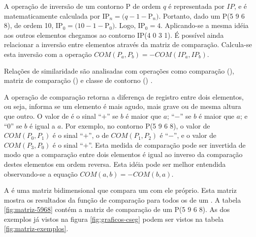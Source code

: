 A operação de inversão de um contorno P de ordem $q$ é representada
por $IP$, e é matematicamente calculada por
IP$_n=(q-1-$P$_n)$. Portanto, dado um  P(5 9 6 8), de ordem
10, IP$_0=(10-1-$P$_0)$. Logo, IP$_0=4$. Aplicando-se a mesma idéia
aos outros elementos chegamos ao contorno IP(4 0 3 1). É possível
ainda relacionar a inversão entre elementos através da matriz de
comparação. Calcula-se esta inversão com a operação
$COM(P_a,P_b)=-COM(IP_a,IP_b)$.

Relações de similaridade \cite{marvin.ea87:relating} são analisadas
com operações como comparação (), matriz de comparação
() e classe de contorno () .

A operação de comparação  retorna a diferença de registro
entre dois elementos, ou seja, informa se um elemento é mais agudo,
mais grave ou de mesma altura que outro. O valor de  é o sinal
``$+$'' se $b$ é maior que $a$; ``$-$'' se $b$ é maior que $a$; e
``$0$'' se $b$ é igual a $a$. Por exemplo, no contorno P(5 9 6 8), o
valor de $COM(P_0,P_1)$ é o sinal ``$+$'', o de $COM(P_1,P_2)$ é
``$-$'', e o valor de $COM(P_3,P_0)$ é o sinal ``$+$''. Esta medida de
comparação pode ser invertida de modo que a comparação entre dois
elementos é igual ao inverso da comparação destes elementos em ordem
reversa. Esta idéia pode ser melhor entendida observando-se a equação
$COM(a,b)=-COM(b,a)$.

A  é uma matriz bidimensional que compara um 
com ele próprio. Esta matriz mostra os resultados da função de
comparação  para todos os  de um . A
tabela \ref{fig:matriz-5968} contém a matriz de comparação de um
 P(5 9 6 8). As  dos exemplos já vistos na
figura \ref{fig:graficos-cseg} podem ser vistos na tabela
\ref{fig:matriz-exemplos}.

